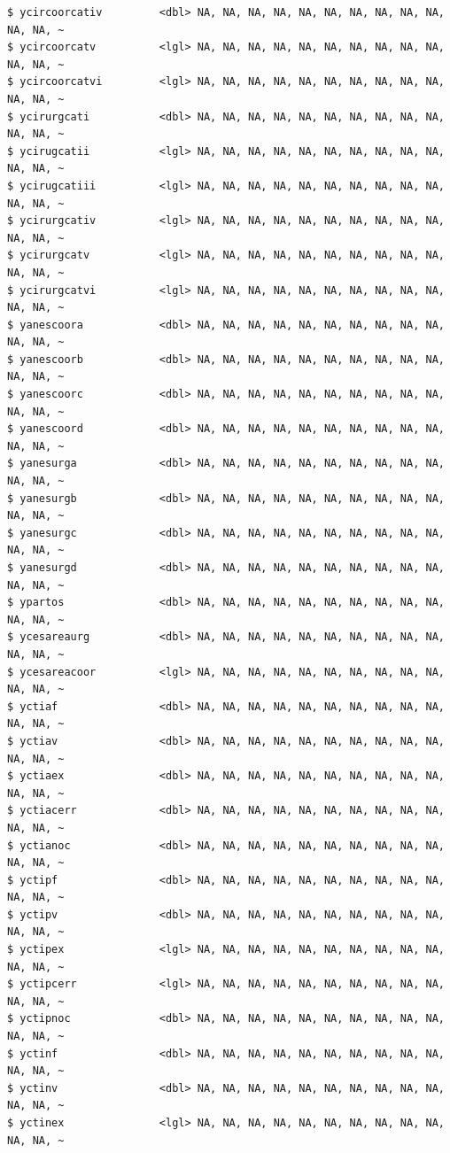 \documentclass[
  letterpaper,
  DIV=11,
  numbers=noendperiod]{scrreprt}
\begin{document}
\begin{verbatim}
$ ycircoorcativ         <dbl> NA, NA, NA, NA, NA, NA, NA, NA, NA, NA, NA, NA, ~
$ ycircoorcatv          <lgl> NA, NA, NA, NA, NA, NA, NA, NA, NA, NA, NA, NA, ~
$ ycircoorcatvi         <lgl> NA, NA, NA, NA, NA, NA, NA, NA, NA, NA, NA, NA, ~
$ ycirurgcati           <dbl> NA, NA, NA, NA, NA, NA, NA, NA, NA, NA, NA, NA, ~
$ ycirugcatii           <lgl> NA, NA, NA, NA, NA, NA, NA, NA, NA, NA, NA, NA, ~
$ ycirugcatiii          <lgl> NA, NA, NA, NA, NA, NA, NA, NA, NA, NA, NA, NA, ~
$ ycirurgcativ          <lgl> NA, NA, NA, NA, NA, NA, NA, NA, NA, NA, NA, NA, ~
$ ycirurgcatv           <lgl> NA, NA, NA, NA, NA, NA, NA, NA, NA, NA, NA, NA, ~
$ ycirurgcatvi          <lgl> NA, NA, NA, NA, NA, NA, NA, NA, NA, NA, NA, NA, ~
$ yanescoora            <dbl> NA, NA, NA, NA, NA, NA, NA, NA, NA, NA, NA, NA, ~
$ yanescoorb            <dbl> NA, NA, NA, NA, NA, NA, NA, NA, NA, NA, NA, NA, ~
$ yanescoorc            <dbl> NA, NA, NA, NA, NA, NA, NA, NA, NA, NA, NA, NA, ~
$ yanescoord            <dbl> NA, NA, NA, NA, NA, NA, NA, NA, NA, NA, NA, NA, ~
$ yanesurga             <dbl> NA, NA, NA, NA, NA, NA, NA, NA, NA, NA, NA, NA, ~
$ yanesurgb             <dbl> NA, NA, NA, NA, NA, NA, NA, NA, NA, NA, NA, NA, ~
$ yanesurgc             <dbl> NA, NA, NA, NA, NA, NA, NA, NA, NA, NA, NA, NA, ~
$ yanesurgd             <dbl> NA, NA, NA, NA, NA, NA, NA, NA, NA, NA, NA, NA, ~
$ ypartos               <dbl> NA, NA, NA, NA, NA, NA, NA, NA, NA, NA, NA, NA, ~
$ ycesareaurg           <dbl> NA, NA, NA, NA, NA, NA, NA, NA, NA, NA, NA, NA, ~
$ ycesareacoor          <lgl> NA, NA, NA, NA, NA, NA, NA, NA, NA, NA, NA, NA, ~
$ yctiaf                <dbl> NA, NA, NA, NA, NA, NA, NA, NA, NA, NA, NA, NA, ~
$ yctiav                <dbl> NA, NA, NA, NA, NA, NA, NA, NA, NA, NA, NA, NA, ~
$ yctiaex               <dbl> NA, NA, NA, NA, NA, NA, NA, NA, NA, NA, NA, NA, ~
$ yctiacerr             <dbl> NA, NA, NA, NA, NA, NA, NA, NA, NA, NA, NA, NA, ~
$ yctianoc              <dbl> NA, NA, NA, NA, NA, NA, NA, NA, NA, NA, NA, NA, ~
$ yctipf                <dbl> NA, NA, NA, NA, NA, NA, NA, NA, NA, NA, NA, NA, ~
$ yctipv                <dbl> NA, NA, NA, NA, NA, NA, NA, NA, NA, NA, NA, NA, ~
$ yctipex               <lgl> NA, NA, NA, NA, NA, NA, NA, NA, NA, NA, NA, NA, ~
$ yctipcerr             <lgl> NA, NA, NA, NA, NA, NA, NA, NA, NA, NA, NA, NA, ~
$ yctipnoc              <dbl> NA, NA, NA, NA, NA, NA, NA, NA, NA, NA, NA, NA, ~
$ yctinf                <dbl> NA, NA, NA, NA, NA, NA, NA, NA, NA, NA, NA, NA, ~
$ yctinv                <dbl> NA, NA, NA, NA, NA, NA, NA, NA, NA, NA, NA, NA, ~
$ yctinex               <lgl> NA, NA, NA, NA, NA, NA, NA, NA, NA, NA, NA, NA, ~

\end{verbatim}
\end{document}
